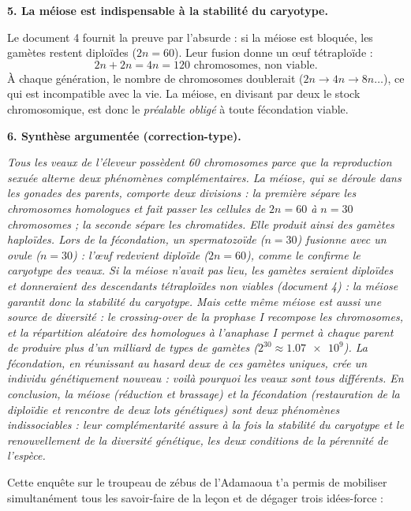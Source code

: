 \documentclass[11pt]{article}
\newcounter{popsec}
\newcounter{popsub}
\newcommand{\courssub}[1]{%
  \stepcounter{popsub}%
  \par\vspace{9pt}\noindent{\popxbold\fontsize{11.5}{13}\selectfont\color{popink}{\color{poporange}\thepopsec.\thepopsub}\hspace{6pt}#1}\par\nopagebreak\vspace{4pt}
}
\begin{document}
\begin{exoresolu}
\medskip
\textbf{5. La méiose est indispensable à la stabilité du caryotype.}

Le document 4 fournit la preuve par l'absurde : si la méiose est bloquée, les gamètes restent diploïdes ($2n = 60$). Leur fusion donne un œuf tétraploïde :
\[
2n + 2n = 4n = 120 \text{ chromosomes, non viable.}
\]
À chaque génération, le nombre de chromosomes doublerait ($2n \rightarrow 4n \rightarrow 8n \ldots$), ce qui est incompatible avec la vie. La méiose, en divisant par deux le stock chromosomique, est donc le \emph{préalable obligé} à toute fécondation viable.

\medskip
\textbf{6. Synthèse argumentée (correction-type).}

\emph{Tous les veaux de l'éleveur possèdent 60 chromosomes parce que la reproduction sexuée alterne deux phénomènes complémentaires. La méiose, qui se déroule dans les gonades des parents, comporte deux divisions : la première sépare les chromosomes homologues et fait passer les cellules de $2n = 60$ à $n = 30$ chromosomes ; la seconde sépare les chromatides. Elle produit ainsi des gamètes haploïdes. Lors de la fécondation, un spermatozoïde ($n = 30$) fusionne avec un ovule ($n = 30$) : l'œuf redevient diploïde ($2n = 60$), comme le confirme le caryotype des veaux. Si la méiose n'avait pas lieu, les gamètes seraient diploïdes et donneraient des descendants tétraploïdes non viables (document 4) : la méiose garantit donc la stabilité du caryotype. Mais cette même méiose est aussi une source de diversité : le crossing-over de la prophase I recompose les chromosomes, et la répartition aléatoire des homologues à l'anaphase I permet à chaque parent de produire plus d'un milliard de types de gamètes ($2^{30} \approx \num{1,07e9}$). La fécondation, en réunissant au hasard deux de ces gamètes uniques, crée un individu génétiquement nouveau : voilà pourquoi les veaux sont tous différents. En conclusion, la méiose (réduction et brassage) et la fécondation (restauration de la diploïdie et rencontre de deux lots génétiques) sont deux phénomènes indissociables : leur complémentarité assure à la fois la stabilité du caryotype et le renouvellement de la diversité génétique, les deux conditions de la pérennité de l'espèce.}
\end{exoresolu}

\courssub{Bilan de l'activité}

Cette enquête sur le troupeau de zébus de l'Adamaoua t'a permis de mobiliser simultanément tous les savoir-faire de la leçon et de dégager trois idées-force :
\end{document}
